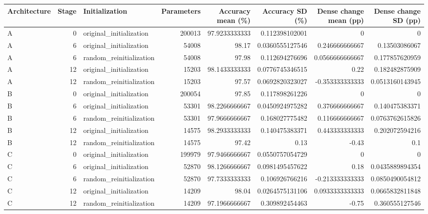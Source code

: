 \begin{tabular}{lrlrrrrr}
\toprule
Architecture & Stage & Initialization & Parameters & Accuracy mean (\%) & Accuracy SD (\%) & Dense change mean (pp) & Dense change SD (pp) \\
\midrule
A & 0 & original\_initialization & 200013 & 97.9233333333 & 0.112398102001 & 0 & 0 \\
A & 6 & original\_initialization & 54008 & 98.17 & 0.0360555127546 & 0.246666666667 & 0.13503086067 \\
A & 6 & random\_reinitialization & 54008 & 97.98 & 0.112694276696 & 0.0566666666667 & 0.177857620959 \\
A & 12 & original\_initialization & 15203 & 98.1433333333 & 0.0776745346515 & 0.22 & 0.182482875909 \\
A & 12 & random\_reinitialization & 15203 & 97.57 & 0.0692820323027 & -0.353333333333 & 0.0513160143945 \\
B & 0 & original\_initialization & 200054 & 97.85 & 0.117898261226 & 0 & 0 \\
B & 6 & original\_initialization & 53301 & 98.2266666667 & 0.0450924975282 & 0.376666666667 & 0.140475383371 \\
B & 6 & random\_reinitialization & 53301 & 97.9666666667 & 0.168027775482 & 0.116666666667 & 0.0763762615826 \\
B & 12 & original\_initialization & 14575 & 98.2933333333 & 0.140475383371 & 0.443333333333 & 0.202072594216 \\
B & 12 & random\_reinitialization & 14575 & 97.42 & 0.13 & -0.43 & 0.1 \\
C & 0 & original\_initialization & 199979 & 97.9466666667 & 0.0550757054729 & 0 & 0 \\
C & 6 & original\_initialization & 52870 & 98.1266666667 & 0.0981495457622 & 0.18 & 0.0435889894354 \\
C & 6 & random\_reinitialization & 52870 & 97.7333333333 & 0.106926766216 & -0.213333333333 & 0.0850490054812 \\
C & 12 & original\_initialization & 14209 & 98.04 & 0.0264575131106 & 0.0933333333333 & 0.0665832811848 \\
C & 12 & random\_reinitialization & 14209 & 97.1966666667 & 0.309892454463 & -0.75 & 0.360555127546 \\
\bottomrule
\end{tabular}
